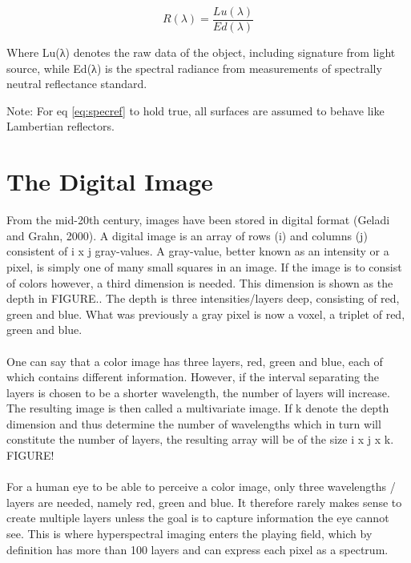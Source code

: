 \begin{equation} \label{eq:specref}
    R(\lambda) = \frac{Lu(\lambda)}{Ed(\lambda)}
\end{equation}

Where Lu(λ) denotes the raw data of the object, including signature from light source, while Ed(λ) is the spectral radiance from measurements of spectrally neutral reflectance standard.

Note: For eq \ref{eq:specref} to hold true, all surfaces are assumed to behave like Lambertian reflectors. 

\section{The Digital Image}

From the mid-20th century, images have been stored in digital format (Geladi and Grahn, 2000). A digital image is an array of rows (i) and columns (j) consistent of i x j gray-values. A gray-value, better known as an intensity or a pixel, is simply one of many small squares in an image. If the image is to consist of colors however, a third dimension is needed. This dimension is shown as the depth in FIGURE.. The depth is three intensities/layers deep, consisting of red, green and blue. What was previously a gray pixel is now a voxel, a triplet of red, green and blue.
\\\\
One can say that a color image has three layers, red, green and blue, each of which contains different information. However, if the interval separating the layers is chosen to be a shorter wavelength, the number of layers will increase. The resulting image is then called a multivariate image. If k denote the depth dimension and thus determine the number of wavelengths which in turn will constitute the number of layers, the resulting array will be of the size i x j x k. FIGURE!
\\\\
For a human eye to be able to perceive a color image, only three wavelengths / layers are needed, namely red, green and blue. It therefore rarely makes sense to create multiple layers unless the goal is to capture information the eye cannot see. This is where hyperspectral imaging enters the playing field, which by definition has more than 100 layers and can express each pixel as a spectrum.

